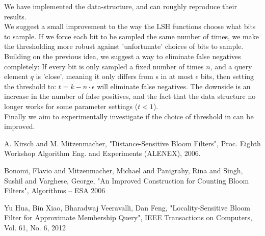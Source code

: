 \documentclass[a4paper,11pt]{article}
\begin{document}
We have implemented the data-structure, and can roughly reproduce their results.
\\

We suggest a small improvement to the way the LSH functions choose what bits to sample. If we force each bit to be sampled the same number of times, we make the thresholding more robust against 'unfortunate' choices of bits to sample. 
\\

Building on the previous idea, we suggest a way to eliminate false negatives completely: If every bit is only sampled a fixed number of times $n$, and a query element $q$ is 'close', meaning it only differs from s in at most $\epsilon$ bits, then setting the threshold to: $t = k - n \cdot \epsilon$ will eliminate false negatives. The downside is an increase in the number of false positives, and the fact that the data structure no longer works for some parameter settings ($t < 1$).
\\

Finally we aim to experimentally investigate if the choice of threshold in \cite{paper:harvard} can be improved.

\begin{thebibliography}{}

A. Kirsch and M. Mitzenmacher, "Distance-Sensitive Bloom Filters", Proc. Eighth Workshop Algorithm Eng. and Experiments (ALENEX), 2006.

Bonomi, Flavio and Mitzenmacher, Michael and Panigrahy, Rina and Singh, Sushil and Varghese, George, "An Improved Construction for Counting Bloom Filters", Algorithms – ESA 2006 

Yu Hua, Bin Xiao, Bharadwaj Veeravalli, Dan Feng, "Locality-Sensitive Bloom Filter for Approximate Membership Query", IEEE Transactions on Computers, Vol. 61, No. 6, 2012
 
\end{thebibliography}
\end{document}
